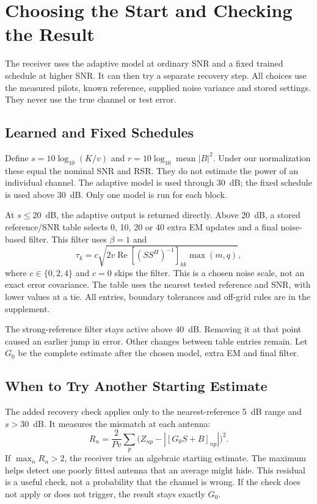 \section{Choosing the Start and Checking the Result}
\label{sec:receiver}
The receiver uses the adaptive model at ordinary SNR and a fixed trained schedule at higher SNR. It can then try a separate recovery step. All choices use the measured pilots, known reference, supplied noise variance and stored settings. They never use the true channel or test error.

\subsection{Learned and Fixed Schedules}
Define $s=10\log_{10}(K/v)$ and $r=10\log_{10}\operatorname{mean}|B|^2$. Under our normalization these equal the nominal SNR and RSR. They do not estimate the power of an individual channel. The adaptive model is used through 30~dB; the fixed schedule is used above 30~dB. Only one model is run for each block.

At $s\le20$~dB, the adaptive output is returned directly. Above 20~dB, a stored reference/SNR table selects 0, 10, 20 or 40 extra EM updates and a final noise-based filter. This filter uses $\beta=1$ and
\begin{equation}
 \tau_k=c\sqrt{2v\operatorname{Re}[(SS^H)^{-1}]_{kk}\max(m,q)},
 \label{eq:finaltau}
\end{equation}
where $c\in\{0,2,4\}$ and $c=0$ skips the filter. This is a chosen noise scale, not an exact error covariance. The table uses the nearest tested reference and SNR, with lower values at a tie. All entries, boundary tolerances and off-grid rules are in the supplement.

The strong-reference filter stays active above 40~dB. Removing it at that point caused an earlier jump in error. Other changes between table entries remain. Let $G_0$ be the complete estimate after the chosen model, extra EM and final filter.

\subsection{When to Try Another Starting Estimate}
The added recovery check applies only to the nearest-reference 5~dB range and $s>30$~dB. It measures the mismatch at each antenna:
\begin{equation}
 R_n=\frac{2}{Pv}\sum_p\bigl(Z_{np}-|[G_0S+B]_{np}|\bigr)^2.
 \label{eq:gate}
\end{equation}
If $\max_nR_n>2$, the receiver tries an algebraic starting estimate. The maximum helps detect one poorly fitted antenna that an average might hide. This residual is a useful check, not a probability that the channel is wrong. If the check does not apply or does not trigger, the result stays exactly $G_0$.


